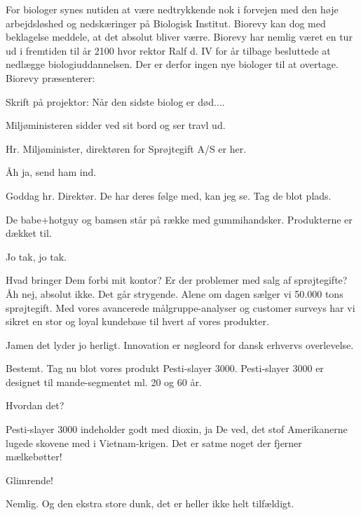 \documentclass[a4paper,12pt]{article}
\begin{document}
\begin{sketch}

For biologer synes nutiden at være nedtrykkende nok i forvejen med den høje arbejdsløshed og nedskæringer på Biologisk Institut. Biorevy kan dog med beklagelse meddele, at det absolut bliver værre. Biorevy har nemlig været en tur ud i fremtiden til år 2100 hvor rektor Ralf d. IV for år tilbage besluttede at nedlægge biologiuddannelsen. Der er derfor ingen nye biologer til at overtage. Biorevy præsenterer:

Skrift på projektor: Når den sidste biolog er død....

\scene Miljøministeren sidder ved sit bord og ser travl ud.

Hr. Miljøminister, direktøren for Sprøjtegift A/S er her.

 Åh ja, send ham ind.

 Goddag hr. Direktør. De har deres følge med, kan jeg se. Tag
de blot plads.

\scene De babe+hotguy og bamsen står på række med
gummihandsker. Produkterne er dækket til.

 Jo tak, jo tak.

 Hvad bringer Dem forbi mit kontor? Er der problemer med salg af sprøjtegifte?
 Åh nej, absolut ikke. Det går strygende. Alene om dagen sælger vi 50.000 tons sprøjtegift. Med vores avancerede målgruppe-analyser og customer surveys har vi sikret en stor og loyal kundebase til hvert af vores produkter.

 Jamen det lyder jo herligt. Innovation er nøgleord for dansk erhvervs overlevelse.

 Bestemt. Tag nu blot vores produkt Pesti-slayer 3000. Pesti-slayer 3000 er designet til mande-segmentet ml. 20 og 60 år. 


 Hvordan det?

 Pesti-slayer 3000 indeholder godt med dioxin, ja De ved, det stof Amerikanerne lugede skovene med i Vietnam-krigen. Det er satme noget der fjerner mælkebøtter!

 Glimrende!

 Nemlig. Og den ekstra store dunk, det er heller ikke helt tilfældigt.



\end{sketch}
\end{document}
